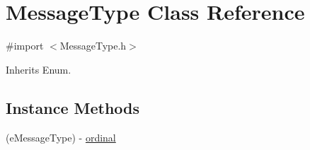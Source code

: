 \hypertarget{interface_message_type}{}\section{Message\+Type Class Reference}
\label{interface_message_type}


{\ttfamily \#import $<$Message\+Type.\+h$>$}



Inherits Enum.

\subsection*{Instance Methods}
\begin{DoxyCompactItemize}
\item 
(e\+Message\+Type) -\/ \hyperlink{interface_message_type_a6231b08346ebc591d708fe3b07a95f1d}{ordinal}
\end{DoxyCompactItemize}
